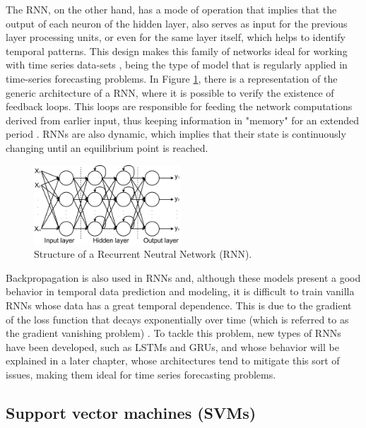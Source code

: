 The \ac{RNN}, on the other hand, has a mode of operation that implies that the output of each neuron of the hidden layer, also serves as input for the previous layer processing units, or even for the same layer itself, which helps to identify temporal patterns. This design makes this family of networks ideal for working with time series data-sets \cite{rnn1}\cite{rnn2}\cite{rnn3}, being the type of model that is regularly applied in time-series forecasting problems. In Figure \ref{rnn}, there is a representation of the generic architecture of a \ac{RNN}, where it is possible to verify the existence of feedback loops. This loops are responsible for feeding the network computations derived from earlier input, thus keeping information in "memory" for an extended period \cite{rnn4}. \ac{RNN}s are also dynamic, which implies that their state is continuously changing until an equilibrium point is reached. 

\begin{figure}[h!]
    \centering
    \begin{center}
    \includegraphics[width=0.49\textwidth]{Images/rnn.png}
    \caption{Structure of a Recurrent Neutral Network (RNN).}
    \label{rnn}
    \end{center}
\end{figure}



Backpropagation is also used in \ac{RNN}s and, although these models present a good behavior in temporal data prediction and modeling, it is difficult to train vanilla \ac{RNN}s whose data has a great temporal dependence. This is due to the gradient of the loss function that decays exponentially over time (which is referred to as the gradient vanishing problem) \cite{rnn4}. To tackle this problem, new types of \ac{RNN}s have been developed, such as \ac{LSTM}s and \ac{GRU}s, and whose behavior will be explained in a later chapter, whose architectures tend to mitigate this sort of issues, making them ideal for time series forecasting problems.

\subsection{Support vector machines (SVMs)}

